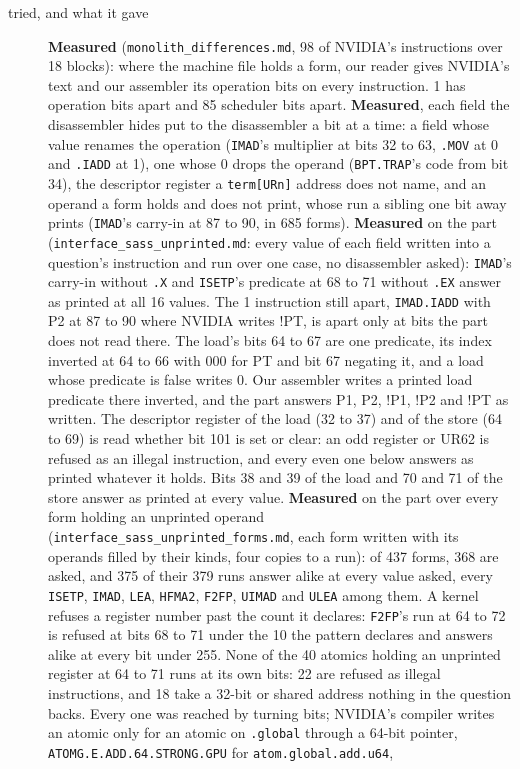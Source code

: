 \begin{description}
\item[{tried, and what it gave}] \textbf{Measured} (\texttt{monolith\_\allowbreak{}differences.\allowbreak{}md}, 98 of NVIDIA's instructions over 18 blocks): where the machine file holds a form, our reader gives NVIDIA's text and our assembler its operation bits on every instruction. 1 has operation bits apart and 85 scheduler bits apart. \textbf{Measured}, each field the disassembler hides put to the disassembler a bit at a time: a field whose value renames the operation (\texttt{IMAD}'s multiplier at bits 32 to 63, \texttt{.\allowbreak{}MOV} at 0 and \texttt{.\allowbreak{}IADD} at 1), one whose 0 drops the operand (\texttt{BPT.\allowbreak{}TRAP}'s code from bit 34), the descriptor register a \texttt{term[URn]} address does not name, and an operand a form holds and does not print, whose run a sibling one bit away prints (\texttt{IMAD}'s carry-in at 87 to 90, in 685 forms). \textbf{Measured} on the part (\texttt{interface\_\allowbreak{}sass\_\allowbreak{}unprinted.\allowbreak{}md}: every value of each field written into a question's instruction and run over one case, no disassembler asked): \texttt{IMAD}'s carry-in without \texttt{.\allowbreak{}X} and \texttt{ISETP}'s predicate at 68 to 71 without \texttt{.\allowbreak{}EX} answer as printed at all 16 values. The 1 instruction still apart, \texttt{IMAD.\allowbreak{}IADD} with P2 at 87 to 90 where NVIDIA writes !PT, is apart only at bits the part does not read there. The load's bits 64 to 67 are one predicate, its index inverted at 64 to 66 with 000 for PT and bit 67 negating it, and a load whose predicate is false writes 0. Our assembler writes a printed load predicate there inverted, and the part answers P1, P2, !P1, !P2 and !PT as written. The descriptor register of the load (32 to 37) and of the store (64 to 69) is read whether bit 101 is set or clear: an odd register or UR62 is refused as an illegal instruction, and every even one below answers as printed whatever it holds. Bits 38 and 39 of the load and 70 and 71 of the store answer as printed at every value. \textbf{Measured} on the part over every form holding an unprinted operand (\texttt{interface\_\allowbreak{}sass\_\allowbreak{}unprinted\_\allowbreak{}forms.\allowbreak{}md}, each form written with its operands filled by their kinds, four copies to a run): of 437 forms, 368 are asked, and 375 of their 379 runs answer alike at every value asked, every \texttt{ISETP}, \texttt{IMAD}, \texttt{LEA}, \texttt{HFMA2}, \texttt{F2FP}, \texttt{UIMAD} and \texttt{ULEA} among them. A kernel refuses a register number past the count it declares: \texttt{F2FP}'s run at 64 to 72 is refused at bits 68 to 71 under the 10 the pattern declares and answers alike at every bit under 255. None of the 40 atomics holding an unprinted register at 64 to 71 runs at its own bits: 22 are refused as illegal instructions, and 18 take a 32-bit or shared address nothing in the question backs. Every one was reached by turning bits; NVIDIA's compiler writes an atomic only for an atomic on \texttt{.\allowbreak{}global} through a 64-bit pointer, \texttt{ATOMG.\allowbreak{}E.\allowbreak{}ADD.\allowbreak{}64.\allowbreak{}STRONG.\allowbreak{}GPU} for \texttt{atom.\allowbreak{}global.\allowbreak{}add.\allowbreak{}u64}, 
\end{description}
